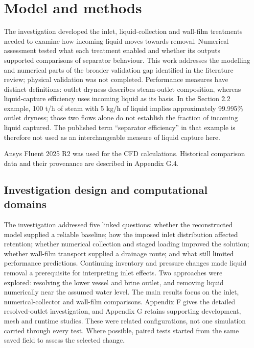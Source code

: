 \section{Model and methods}

The investigation developed the inlet, liquid-collection and wall-film treatments needed to examine how incoming liquid moves towards removal. Numerical assessment tested what each treatment enabled and whether its outputs supported comparisons of separator behaviour. This work addresses the modelling and numerical parts of the broader validation gap identified in the literature review; physical validation was not completed. Performance measures have distinct definitions: outlet dryness describes steam-outlet composition, whereas liquid-capture efficiency uses incoming liquid as its basis. In the Section 2.2 example, 100 t/h of steam with 5 kg/h of liquid implies approximately 99.995\% outlet dryness; those two flows alone do not establish the fraction of incoming liquid captured. The published term ``separator efficiency'' in that example is therefore not used as an interchangeable measure of liquid capture here.

Ansys Fluent 2025 R2 was used for the CFD calculations. Historical comparison data and their provenance are described in Appendix G.4.

\subsection{Investigation design and computational domains}

The investigation addressed five linked questions: whether the reconstructed model supplied a reliable baseline; how the imposed inlet distribution affected retention; whether numerical collection and staged loading improved the solution; whether wall-film transport supplied a drainage route; and what still limited performance predictions. Continuing inventory and pressure changes made liquid removal a prerequisite for interpreting inlet effects. Two approaches were explored: resolving the lower vessel and brine outlet, and removing liquid numerically near the assumed water level. The main results focus on the inlet, numerical-collector and wall-film comparisons. Appendix F gives the detailed resolved-outlet investigation, and Appendix G retains supporting development, mesh and runtime studies. These were related configurations, not one simulation carried through every test. Where possible, paired tests started from the same saved field to assess the selected change.

